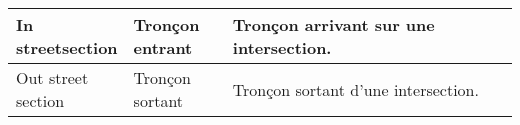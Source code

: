 \begin{table}[]
\begin{longtable}{|p{0.2\linewidth}|p{0.2\linewidth}|p{0.6\linewidth}|}
In streetsection                            & Tronçon entrant                & Tronçon arrivant sur une intersection.                                                                                                                                                                                                                                              \\ \hline
Out street section                          & Tronçon sortant                & Tronçon sortant d'une intersection.                                                                                                                                                                                                                                                 \\ \hline
\end{longtable}%
\end{table}
